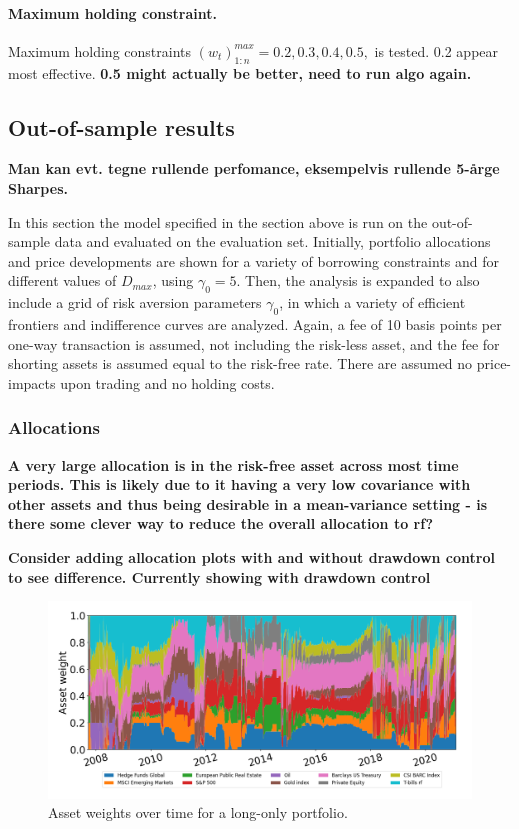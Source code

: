 \paragraph{\textbf{Maximum holding constraint.}} Maximum holding constraints $(w_t)_{1:n}^{max}=0.2,0.3,0.4,0.5,$ is tested. 0.2 appear most effective. \textbf{0.5 might actually be better, need to run algo again.}


\subsection{Out-of-sample results}

\textbf{Man kan evt. tegne rullende perfomance, eksempelvis rullende 5-årge Sharpes.}

In this section the model specified in the section above is run on the out-of-sample data and evaluated on the evaluation set. Initially, portfolio allocations and price developments are shown for a variety of borrowing constraints and for different values of $D_{max}$, using $\gamma_0=5$. Then, the analysis is expanded to also include a grid of risk aversion parameters $\gamma_0$, in which a variety of efficient frontiers and indifference curves are analyzed. Again, a fee of 10 basis points per one-way transaction is assumed, not including the risk-less asset, and the fee for shorting assets is assumed equal to the risk-free rate. There are assumed no price-impacts upon trading and no holding costs.

\subsubsection*{Allocations}

\textbf{A very large allocation is in the risk-free asset across most time periods. This is likely due to it having a very low covariance with other assets and thus being desirable in a mean-variance setting - is there some clever way to reduce the overall allocation to rf?}

\textbf{Consider adding allocation plots with and without drawdown control to see difference. Currently showing with drawdown control}

\begin{figure}[H]
    \centering
    \includegraphics[width=1\textwidth]{analysis/portfolio_exercise/images/mle/weights_lo.png}
    \caption[Asset weights over time for a long-only portfolio]{Asset weights over time for a long-only portfolio.}
    \label{fig:MPC_port_weights_lo}
\end{figure}

